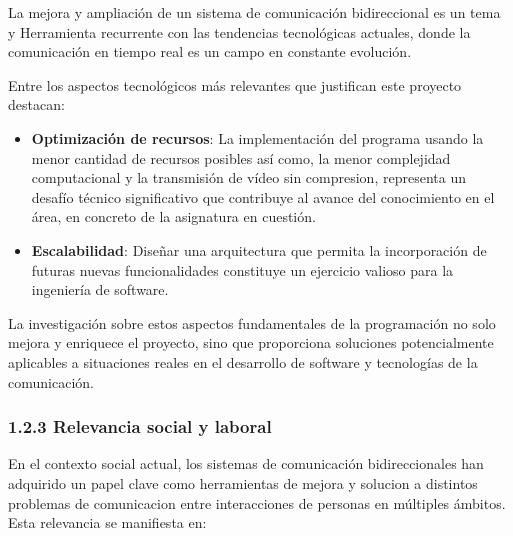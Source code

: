 La mejora y ampliación de un sistema de comunicación bidireccional es un tema y Herramienta recurrente con las tendencias tecnológicas actuales, donde la comunicación en tiempo real es un campo en constante evolución. 

\vspace{\baselineskip}

Entre los aspectos tecnológicos más relevantes que justifican este proyecto destacan:

\begin{itemize}
    \item \textbf{Optimización de recursos}: La implementación del programa usando la menor cantidad de recursos posibles así como, la menor complejidad computacional y la transmisión de vídeo sin compresion, representa un desafío técnico significativo que contribuye al avance del conocimiento en el área, en concreto de la asignatura en cuestión.
    
    \item \textbf{Escalabilidad}: Diseñar una arquitectura que permita la incorporación de futuras nuevas funcionalidades constituye un ejercicio valioso para la ingeniería de software.
\end{itemize}
\vspace{\baselineskip}
La investigación sobre estos aspectos fundamentales de la programación no solo mejora y enriquece el proyecto, sino que proporciona soluciones potencialmente aplicables a situaciones reales en el desarrollo de software y tecnologías de la comunicación.

\subsubsection*{1.2.3 Relevancia social y laboral}

En el contexto social actual, los sistemas de comunicación bidireccionales han adquirido un papel clave como herramientas de mejora y solucion a distintos problemas de comunicacion entre interacciones de personas en múltiples ámbitos. Esta relevancia se manifiesta en:

